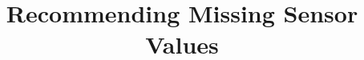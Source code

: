 \documentclass[10pt,nocopyrightspace]{ipsn13}
\title{Recommending Missing Sensor Values}
\numberwithin{equation}{section}
\begin{document}
\makeatletter
\let\@copyrightspace\relax
\makeatother

\maketitle












%
\balance


\end{document}
